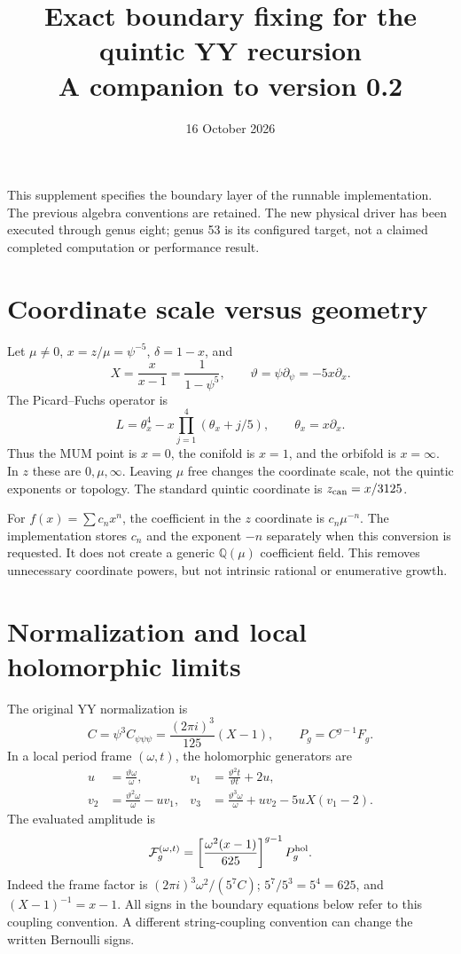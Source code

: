 \documentclass[11pt]{article}
\title{Exact boundary fixing for the quintic YY recursion\\A companion to version 0.2}
\author{}\date{16 October 2026}
\newcommand{\tht}{\vartheta}
\newcommand{\Q}{\mathbb Q}
\begin{document}
\maketitle
\noindent
This supplement specifies the boundary layer of the runnable implementation.
The previous algebra conventions are retained. The new physical driver has
been executed through genus eight; genus 53 is its configured target, not a
claimed completed computation or performance result.

\section{Coordinate scale versus geometry}
Let $\mu\ne0$, $x=z/\mu=\psi^{-5}$, $\delta=1-x$, and
\[
 X=\frac{x}{x-1}=\frac1{1-\psi^5},\qquad
 \tht=\psi\partial_\psi=-5x\partial_x.
\]
The Picard--Fuchs operator is
\[
 L=\theta_x^4-x\prod_{j=1}^4(\theta_x+j/5),\qquad\theta_x=x\partial_x.
\]
Thus the MUM point is $x=0$, the conifold is $x=1$, and the orbifold is
$x=\infty$. In $z$ these are $0,\mu,\infty$. Leaving $\mu$ free changes the
coordinate scale, not the quintic exponents or topology. The standard quintic
coordinate is $z_{\rm can}=x/3125$.

For $f(x)=\sum c_nx^n$, the coefficient in the $z$ coordinate is
$c_n\mu^{-n}$. The implementation stores $c_n$ and the exponent $-n$
separately when this conversion is requested. It does not create a generic
$\Q(\mu)$ coefficient field. This removes unnecessary coordinate powers, but
not intrinsic rational or enumerative growth.

\section{Normalization and local holomorphic limits}
The original YY normalization is
\[
 C=\psi^3C_{\psi\psi\psi}=\frac{(2\pi i)^3}{125}(X-1),\qquad
 P_g=C^{g-1}F_g.
\]
In a local period frame $(\omega,t)$, the holomorphic generators are
\begin{align*}
 u&=\frac{\tht\omega}{\omega},&
 v_1&=\frac{\tht^2t}{\tht t}+2u,\\
 v_2&=\frac{\tht^2\omega}{\omega}-uv_1,&
 v_3&=\frac{\tht^3\omega}{\omega}+uv_2-5uX(v_1-2).
\end{align*}
The evaluated amplitude is
\[
 \mathcal F_g^{(\omega,t)}=
 \left[\frac{\omega^2(x-1)}{625}\right]^{g-1}P_g^{\rm hol}.
\]
Indeed the frame factor is $(2\pi i)^3\omega^2/(5^7C)$;
$5^7/5^3=5^4=625$, and $(X-1)^{-1}=x-1$.
All signs in the boundary equations below refer to this coupling convention.
A different string-coupling convention can change the written Bernoulli signs.
\end{document}

